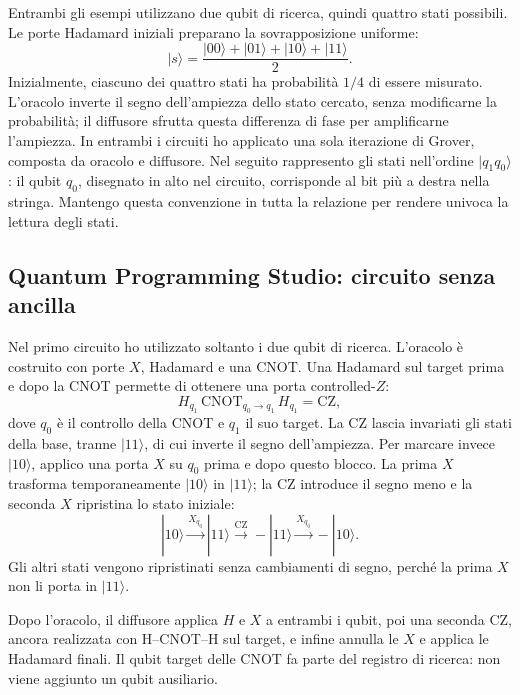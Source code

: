 ﻿\documentclass[a4paper,12pt]{article}
\begin{document}
Entrambi gli esempi utilizzano due qubit di ricerca, quindi quattro stati
possibili. Le porte Hadamard iniziali preparano la sovrapposizione uniforme:
\[
 |s\rangle=\frac{|00\rangle+|01\rangle+|10\rangle+|11\rangle}{2}.
\]
Inizialmente, ciascuno dei quattro stati ha probabilità $1/4$ di essere
misurato. L'oracolo inverte il segno dell'ampiezza dello stato cercato,
senza modificarne la probabilità; il diffusore sfrutta questa differenza
di fase per amplificarne l'ampiezza. In entrambi i circuiti ho applicato
una sola iterazione di Grover, composta da oracolo e diffusore.
Nel seguito rappresento gli stati nell'ordine $|q_1q_0\rangle$:
il qubit $q_0$, disegnato in alto nel circuito, corrisponde al bit più
a destra nella stringa. Mantengo questa convenzione in tutta la relazione
per rendere univoca la lettura degli stati.
\newpage
\subsection{Quantum Programming Studio: circuito senza ancilla}
Nel primo circuito ho utilizzato soltanto i due qubit di ricerca.
L'oracolo è costruito con porte $X$, Hadamard e una CNOT.
Una Hadamard sul target prima e dopo la CNOT permette di ottenere
una porta controlled-$Z$:
\[
 H_{q_1}\,\mathrm{CNOT}_{q_0\to q_1}\,H_{q_1}=\mathrm{CZ},
\]
dove $q_0$ è il controllo della CNOT e $q_1$ il suo target.
La CZ lascia invariati gli stati della base, tranne $|11\rangle$,
di cui inverte il segno dell'ampiezza. Per marcare invece $|10\rangle$,
applico una porta $X$ su $q_0$ prima e dopo questo blocco.
La prima $X$ trasforma temporaneamente $|10\rangle$ in $|11\rangle$;
la CZ introduce il segno meno e la seconda $X$ ripristina lo stato iniziale:
\[
 |10\rangle \xrightarrow{X_{q_0}} |11\rangle
 \xrightarrow{\mathrm{CZ}} -|11\rangle
 \xrightarrow{X_{q_0}} -|10\rangle.
\]
Gli altri stati vengono ripristinati senza cambiamenti di segno, perché
la prima $X$ non li porta in $|11\rangle$.

\begin{center}
\setlength{\fboxsep}{10pt}
\end{center}

Dopo l'oracolo, il diffusore applica $H$ e $X$ a entrambi i qubit,
poi una seconda CZ, ancora realizzata con H--CNOT--H sul target,
e infine annulla le $X$ e applica le Hadamard finali.
Il qubit target delle CNOT fa parte del registro di ricerca:
non viene aggiunto un qubit ausiliario.
\end{document}
